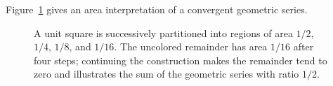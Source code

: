 Figure~\ref{fig:atlas-geometric-area} gives an area interpretation of a convergent geometric series.

\begin{figure}[!htbp]
\centering
{}
\caption{A unit square is successively partitioned into regions of area $1/2$, $1/4$, $1/8$, and $1/16$. The uncolored remainder has area $1/16$ after four steps; continuing the construction makes the remainder tend to zero and illustrates the sum of the geometric series with ratio $1/2$.}
\label{fig:atlas-geometric-area}
\end{figure}